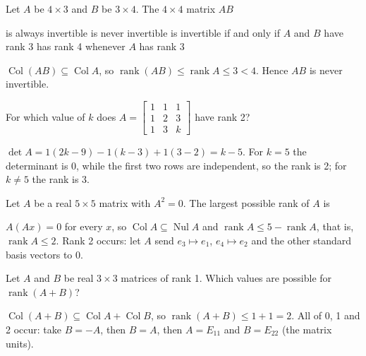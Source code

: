 \begin{question}[id=rank-7, marks=2]
Let $A$ be $4 \times 3$ and $B$ be $3 \times 4$. The $4 \times 4$ matrix $AB$
\begin{options}
  \option is always invertible
  \correct is never invertible
  \option is invertible if and only if $A$ and $B$ have rank 3
  \option has rank 4 whenever $A$ has rank 3
\end{options}
\begin{solution}
$\operatorname{Col}(AB) \subseteq \operatorname{Col} A$, so $\operatorname{rank}(AB) \le \operatorname{rank} A \le 3 < 4$. Hence $AB$ is never invertible.
\end{solution}
\end{question}

\begin{question}[id=rank-8, marks=2]
For which value of $k$ does $A = \begin{bmatrix} 1 & 1 & 1 \\ 1 & 2 & 3 \\ 1 & 3 & k \end{bmatrix}$ have rank 2?
\begin{solution}
$\det A = 1(2k - 9) - 1(k - 3) + 1(3 - 2) = k - 5$. For $k = 5$ the determinant is 0, while the first two rows are independent, so the rank is 2; for $k \ne 5$ the rank is 3.
\end{solution}
\end{question}

\begin{question}[id=rank-9, marks=2]
Let $A$ be a real $5 \times 5$ matrix with $A^2 = 0$. The largest possible rank of $A$ is
\begin{solution}
$A(Ax) = 0$ for every $x$, so $\operatorname{Col} A \subseteq \operatorname{Nul} A$ and $\operatorname{rank} A \le 5 - \operatorname{rank} A$, that is, $\operatorname{rank} A \le 2$. Rank 2 occurs: let $A$ send $e_3 \mapsto e_1$, $e_4 \mapsto e_2$ and the other standard basis vectors to 0.
\end{solution}
\end{question}

\begin{question}[id=rank-10, type=msq, marks=2]
Let $A$ and $B$ be real $3 \times 3$ matrices of rank 1. Which values are possible for $\operatorname{rank}(A + B)$?
\begin{options}
\end{options}
\begin{solution}
$\operatorname{Col}(A + B) \subseteq \operatorname{Col} A + \operatorname{Col} B$, so $\operatorname{rank}(A + B) \le 1 + 1 = 2$. All of 0, 1 and 2 occur: take $B = -A$, then $B = A$, then $A = E_{11}$ and $B = E_{22}$ (the matrix units).
\end{solution}
\end{question}

